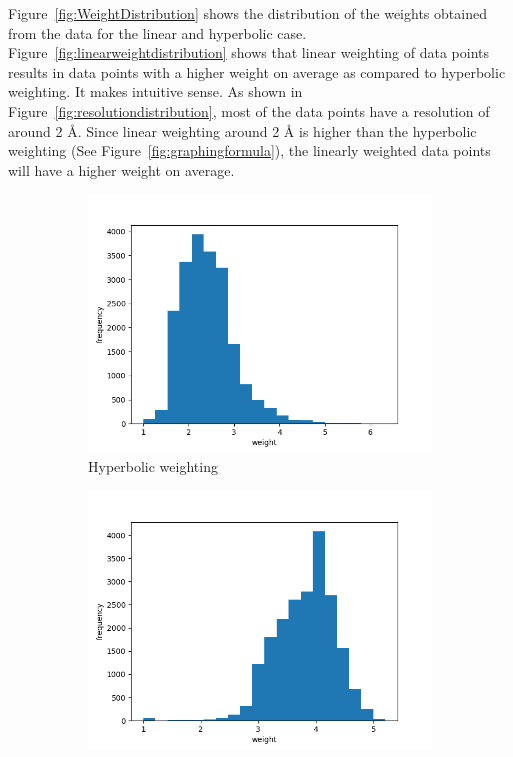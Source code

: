 \documentclass[11pt]{article}
\begin{document}
Figure~\ref{fig:WeightDistribution} shows the distribution of the weights obtained from the data for the linear and hyperbolic case.
Figure~\ref{fig:linearweightdistribution} shows that linear weighting of data points results in data points with a higher weight on average as compared to hyperbolic weighting.
It makes intuitive sense. As shown in Figure~\ref{fig:resolutiondistribution}, 
most of the data points have a resolution of around 2 \si{\angstrom}.
Since linear weighting around 2 \si{\angstrom} is higher than the hyperbolic weighting (See Figure~\ref{fig:graphingformula}), the linearly weighted data points will have a higher weight on average.

\begin{figure}
     \centering
     \begin{subfigure}[b]{0.45\textwidth}
         \centering
    \includegraphics[scale=0.5]{images/hyperbolicweightdistribution}
    \caption{Hyperbolic weighting}
    \label{fig:hyperbolicweightdistribution}
     \end{subfigure}
     \hfill
     \begin{subfigure}[b]{0.45\textwidth}
         \centering
        \includegraphics[scale=0.5]{images/linearweightdistribution}

\end{subfigure}
\end{figure}
\end{document}
